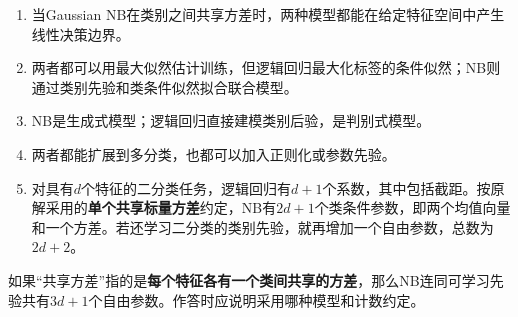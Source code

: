 
\begin{enumerate}[start=1]

\item 当Gaussian NB在类别之间共享方差时，两种模型都能在给定特征空间中产生线性决策边界。

\item 两者都可以用最大似然估计训练，但逻辑回归最大化标签的条件似然；NB则通过类别先验和类条件似然拟合联合模型。

\item NB是生成式模型；逻辑回归直接建模类别后验，是判别式模型。

\item 两者都能扩展到多分类，也都可以加入正则化或参数先验。

\item 对具有\(d\)个特征的二分类任务，逻辑回归有\(d+1\)个系数，其中包括截距。按原解采用的\textbf{单个共享标量方差}约定，NB有\(2d+1\)个类条件参数，即两个均值向量和一个方差。若还学习二分类的类别先验，就再增加一个自由参数，总数为\(2d+2\)。

\end{enumerate}


如果“共享方差”指的是\textbf{每个特征各有一个类间共享的方差}，那么NB连同可学习先验共有\(3d+1\)个自由参数。作答时应说明采用哪种模型和计数约定。
